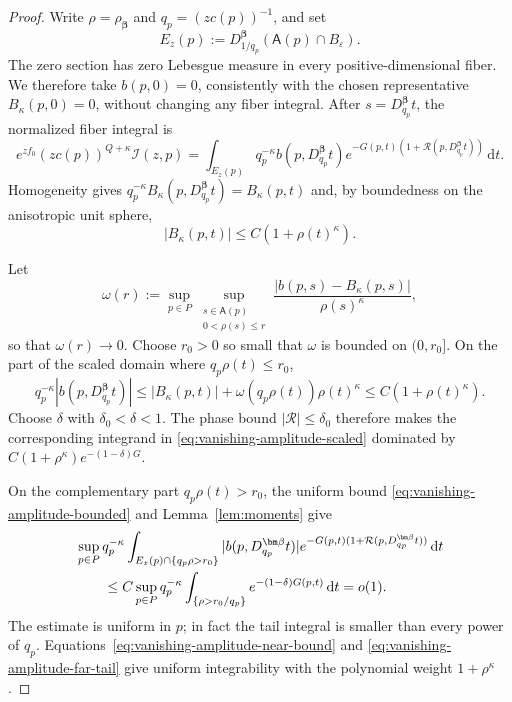 \documentclass[11pt]{amsart}
\numberwithin{equation}{section}
\theoremstyle{definition}
\theoremstyle{remark}
\newcommand{\dd}{\,\mathrm{d}}
\newcommand{\eps}{\varepsilon}
\newcommand{\cI}{\mathcal{I}}
\newcommand{\Afib}{\mathsf{A}}
\begin{document}
\begin{proof}
Write $\rho=\rho_{\bm\beta}$ and $q_p=(zc(p))^{-1}$, and set
\[
 E_z(p):=D_{1/q_p}^{\bm\beta}(\Afib(p)\cap B_\eps).
\]
The zero section has zero Lebesgue measure in every positive-dimensional
fiber.  We therefore take $b(p,0)=0$, consistently with the chosen
representative $B_\kappa(p,0)=0$, without changing any fiber integral.  After
$s=D_{q_p}^{\bm\beta}t$, the normalized fiber integral is
\begin{equation}\label{eq:vanishing-amplitude-scaled}
 e^{zf_0}(zc(p))^{Q+\kappa}\cI(z,p)
 =\int_{E_z(p)}q_p^{-\kappa}b(p,D_{q_p}^{\bm\beta}t)
 e^{-G(p,t)(1+\mathcal R(p,D_{q_p}^{\bm\beta}t))}\dd t.
\end{equation}
Homogeneity gives
$q_p^{-\kappa}B_\kappa(p,D_{q_p}^{\bm\beta}t)=B_\kappa(p,t)$ and, by boundedness on
the anisotropic unit sphere,
\begin{equation}\label{eq:B-kappa-growth}
 |B_\kappa(p,t)|\le C(1+\rho(t)^\kappa).
\end{equation}

Let
\[
 \omega(r):=\sup_{p\in P}
 \sup_{\substack{s\in\Afib(p)\\0<\rho(s)\le r}}
 \frac{|b(p,s)-B_\kappa(p,s)|}{\rho(s)^\kappa},
\]
so that $\omega(r)\to0$.  Choose $r_0>0$ so small that $\omega$ is bounded on
$(0,r_0]$.  On the part of the scaled domain where
$q_p\rho(t)\le r_0$,
\begin{equation}\label{eq:vanishing-amplitude-near-bound}
 q_p^{-\kappa}|b(p,D_{q_p}^{\bm\beta}t)|
 \le |B_\kappa(p,t)|+\omega(q_p\rho(t))\rho(t)^\kappa
 \le C(1+\rho(t)^\kappa).
\end{equation}
Choose $\delta$ with $\delta_0<\delta<1$.  The phase bound
$|\mathcal R|\le\delta_0$ therefore makes the corresponding integrand in
\eqref{eq:vanishing-amplitude-scaled} dominated by
$C(1+\rho^\kappa)e^{-(1-\delta)G}$.

On the complementary part $q_p\rho(t)>r_0$, the uniform bound
\eqref{eq:vanishing-amplitude-bounded} and Lemma~\ref{lem:moments} give
\begin{align}
 &\sup_{p\in P}q_p^{-\kappa}
 \int_{E_z(p)\cap\{q_p\rho>r_0\}}
 |b(p,D_{q_p}^{\bm\beta}t)|
 e^{-G(p,t)(1+\mathcal R(p,D_{q_p}^{\bm\beta}t))}\dd t\notag\\
 &\qquad\le C\sup_{p\in P}q_p^{-\kappa}
 \int_{\{\rho>r_0/q_p\}}
 e^{-(1-\delta)G(p,t)}\dd t=o(1).
 \label{eq:vanishing-amplitude-far-tail}
\end{align}
The estimate is uniform in $p$; in fact the tail integral is smaller than
every power of $q_p$.  Equations~\eqref{eq:vanishing-amplitude-near-bound} and
\eqref{eq:vanishing-amplitude-far-tail} give uniform integrability with the
polynomial weight $1+\rho^\kappa$.


\end{proof}
\end{document}
